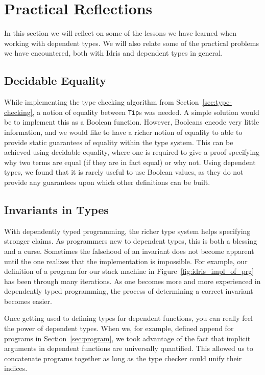 \section{Practical Reflections}
\label{sec:practical-reflections}
In this section we will reflect on some of the lessons we have learned when working with dependent types. We will also relate some of the practical problems we have encountered, both with Idris and dependent types in general.

\subsection{Decidable Equality}
While implementing the type checking algorithm from Section~\ref{sec:type-checking}, a notion of equality between \texttt{Tip}s was needed. A simple solution would be to implement this as a Boolean function. However, Booleans encode very little information, and we would like to have a richer notion of equality to able to provide static guarantees of equality within the type system. This can be achieved using decidable equality, where one is required to give a proof specifying why two terms are equal (if they are in fact equal) or why not. Using dependent types, we found that it is rarely useful to use Boolean values, as they do not provide any guarantees upon which other definitions can be built.

\subsection{Invariants in Types}
With dependently typed programming, the richer type system helps specifying stronger claims. As programmers new to dependent types, this is both a blessing and a curse. Sometimes the falsehood of an invariant does not become apparent until the one realizes that the implementation is impossible. For example, our definition of a program for our stack machine in Figure~\ref{fig:idris_impl_of_prg} has been through many iterations. As one becomes more and more experienced in dependently typed programming, the process of determining a correct invariant becomes easier.

Once getting used to defining types for dependent functions, you can really feel the power of dependent types. When we, for example, defined append for programs in Section~\ref{sec:program}, we took advantage of the fact that implicit arguments in dependent functions are universally quantified. This allowed us to concatenate programs together as long as the type checker could unify their indices.

